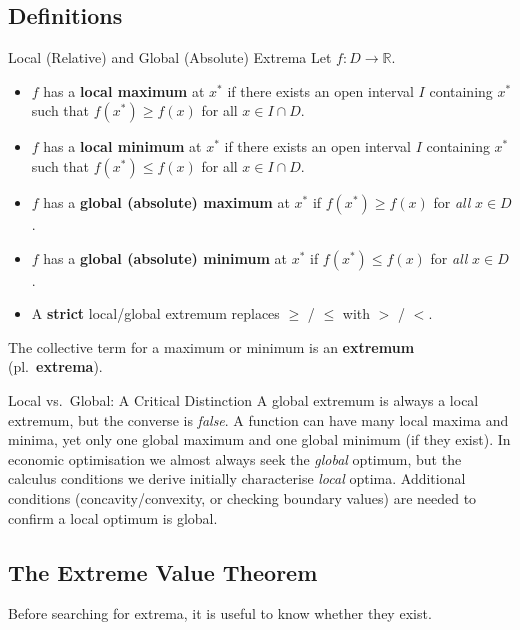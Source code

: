 \documentclass[12pt, a4paper]{article}
\theoremstyle{definition}
\newcommand{\R}{\mathbb{R}}
\begin{document}
\subsection{Definitions}

\begin{defbox}{Local (Relative) and Global (Absolute) Extrema}
Let $f: D \to \R$.
\begin{itemize}
  \item $f$ has a \textbf{local maximum} at $x^*$ if there exists an open
        interval $I$ containing $x^*$ such that
        $f(x^*) \geq f(x)$ for all $x \in I \cap D$.

  \item $f$ has a \textbf{local minimum} at $x^*$ if there exists an open
        interval $I$ containing $x^*$ such that
        $f(x^*) \leq f(x)$ for all $x \in I \cap D$.

  \item $f$ has a \textbf{global (absolute) maximum} at $x^*$ if
        $f(x^*) \geq f(x)$ for \emph{all} $x \in D$.

  \item $f$ has a \textbf{global (absolute) minimum} at $x^*$ if
        $f(x^*) \leq f(x)$ for \emph{all} $x \in D$.

  \item A \textbf{strict} local/global extremum replaces $\geq$ / $\leq$
        with $>$ / $<$.
\end{itemize}
The collective term for a maximum or minimum is an \textbf{extremum}
(pl.\ \textbf{extrema}).
\end{defbox}
\newpage
\begin{warnbox}{Local vs.\ Global: A Critical Distinction}
A global extremum is always a local extremum, but the converse is
\emph{false}.  A function can have many local maxima and minima, yet only one
global maximum and one global minimum (if they exist).  In economic
optimisation we almost always seek the \emph{global} optimum, but the
calculus conditions we derive initially characterise \emph{local} optima.
Additional conditions (concavity/convexity, or checking boundary values) are
needed to confirm a local optimum is global.
\end{warnbox}

\subsection{The Extreme Value Theorem}

Before searching for extrema, it is useful to know whether they exist.
\end{document}
